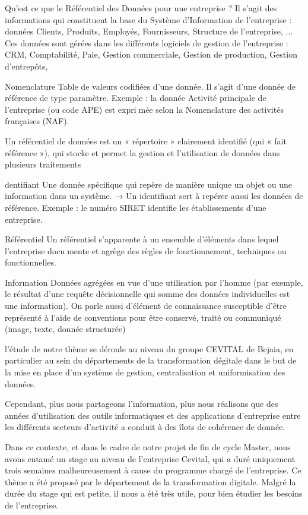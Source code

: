 \par Qu'est ce que le Référentiel des Données pour une entreprise ?
Il s'agit des informations qui constituent la base du Système d'Information de l'entreprise : données Clients, Produits, Employés, Fournisseurs, Structure de l'entreprise, ...
Ces données sont gérées dans les différents logiciels de gestion de l'entreprise : CRM, Comptabilité, Paie, Gestion commerciale, Gestion de production, Gestion d'entrepôts,
\par Nomenclature
Table de valeurs codifiées d’une donnée. Il s’agit d’une donnée de référence de type
paramètre.
Exemple : la donnée Activité principale de l’entreprise (ou code APE) est exprimée selon la Nomenclature des activités françaises (NAF).
\par
Un référentiel de données est un « répertoire » clairement identifié (qui « fait
référence »), qui stocke et permet la gestion et l’utilisation de données dans plusieurs
traitements
\par dentifiant
Une donnée spécifique qui repère de manière unique un objet ou une information
dans un système.
→ Un identifiant sert à repérer aussi les données de référence.
Exemple : le numéro SIRET identifie les établissements d’une entreprise.
\par
Référentiel
Un référentiel s’apparente à un ensemble d’éléments dans lequel l’entreprise documente et agrège des règles de fonctionnement, techniques ou fonctionnelles.

\par Information
Données agrégées en vue d’une utilisation par l’homme (par exemple, le résultat
d’une requête décisionnelle qui somme des données individuelles est une information). On parle aussi d’élément de connaissance susceptible d’être représenté à l’aide
de conventions pour être conservé, traité ou communiqué (image, texte, donnée
structurée)
\par
l'étude de notre thème se déroule au niveau du groupe CEVITAL de Bejaia, en particulier au sein du départements de la transformation dégitale dans le but de la mise en place d'un système de gestion, centralisation et uniformisation des données.






\vspace{0.5cm}
\par Cependant, plus nous partageons l'information, plus nous réalisons que des années d'utilisation des outils informatiques et des applications d'entreprise entre les différents secteurs d'activité a conduit à des îlots de cohérence de donnée.
\vspace{0.5cm}
\par Dans ce contexte, et dans le cadre de notre projet de fin de cycle Master, nous avons entamé un stage au niveau de l'entreprise Cevital, qui a duré uniquement trois semaines malheureusement à cause du programme chargé de l'entreprise. Ce thème a été proposé  par le département de la transformation digitale. Malgré la durée du stage qui est petite, il nous a été très utile, pour bien étudier les besoins de l'entreprise.


